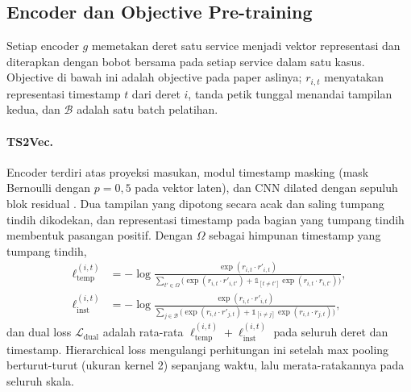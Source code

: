 \subsection{Encoder dan Objective Pre-training}
Setiap encoder $g$ memetakan deret satu service menjadi vektor representasi dan diterapkan dengan bobot bersama pada setiap service dalam satu kasus. Objective di bawah ini adalah objective pada paper aslinya; $r_{i,t}$ menyatakan representasi timestamp $t$ dari deret $i$, tanda petik tunggal menandai tampilan kedua, dan $\mathcal{B}$ adalah satu batch pelatihan.

\paragraph{TS2Vec.} Encoder terdiri atas proyeksi masukan, modul timestamp masking (mask Bernoulli dengan $p=0{,}5$ pada vektor laten), dan CNN dilated dengan sepuluh blok residual \cite{yue2022ts2vec}. Dua tampilan yang dipotong secara acak dan saling tumpang tindih dikodekan, dan representasi timestamp pada bagian yang tumpang tindih membentuk pasangan positif. Dengan $\Omega$ sebagai himpunan timestamp yang tumpang tindih,
\begin{align}
\ell_{\mathrm{temp}}^{(i,t)} &= -\log\frac{\exp(r_{i,t}\cdot r'_{i,t})}{\sum_{t'\in\Omega}\bigl(\exp(r_{i,t}\cdot r'_{i,t'})+\mathbb{1}_{[t\neq t']}\exp(r_{i,t}\cdot r_{i,t'})\bigr)},\\
\ell_{\mathrm{inst}}^{(i,t)} &= -\log\frac{\exp(r_{i,t}\cdot r'_{i,t})}{\sum_{j\in\mathcal{B}}\bigl(\exp(r_{i,t}\cdot r'_{j,t})+\mathbb{1}_{[i\neq j]}\exp(r_{i,t}\cdot r_{j,t})\bigr)},
\end{align}
dan dual loss $\mathcal{L}_{\mathrm{dual}}$ adalah rata-rata $\ell_{\mathrm{temp}}^{(i,t)}+\ell_{\mathrm{inst}}^{(i,t)}$ pada seluruh deret dan timestamp. Hierarchical loss mengulangi perhitungan ini setelah max pooling berturut-turut (ukuran kernel 2) sepanjang waktu, lalu merata-ratakannya pada seluruh skala.

